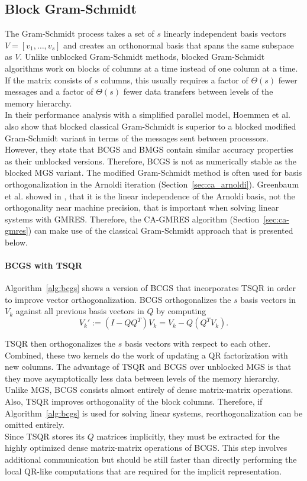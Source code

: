 \documentclass{scrartcl}
\numberwithin{equation}{section}
\begin{document}
\subsection{Block Gram-Schmidt} \label{sec:block gram-schmidt}
The Gram-Schmidt process takes a set of $s$ linearly independent basis vectors $V = [v_1, \ldots, v_s]$ and creates an orthonormal basis that spans the same subspace as $V$. Unlike unblocked Gram-Schmidt methods, blocked Gram-Schmidt algorithms work on blocks of columns at a time instead of one column at a time. If the matrix consists of $s$ columns, this usually requires a factor of $\Theta (s)$ fewer messages and a factor of $\Theta(s)$ fewer data transfers between levels of the memory hierarchy.\\
In their performance analysis with a simplified parallel model, Hoemmen et al. \cite{Hoemmen:2010:CKS:1970638} also show that blocked classical Gram-Schmidt is superior to a blocked modified Gram-Schmidt variant in terms of the messages sent between processors. However, they state that BCGS and BMGS contain similar accuracy properties as their unblocked versions. Therefore, BCGS is not as numerically stable as the blocked MGS variant. The modified Gram-Schmidt method is often used for basis orthogonalization in the Arnoldi iteration (Section~\ref{sec:ca_arnoldi}). Greenbaum et al. showed in \cite{Greenbaum97numericalbehaviour}, that it is the linear independence of the Arnoldi basis, not the orthogonality near machine precision, that is important when solving linear systems with GMRES. Therefore, the CA-GMRES algorithm (Section~\ref{sec:ca-gmres}) can make use of the classical Gram-Schmidt approach that is presented below.

\paragraph{BCGS with TSQR} Algorithm~\ref{alg:bcgs} shows a version of BCGS that incorporates TSQR in order to improve vector orthogonalization. BCGS orthogonalizes the $s$ basis vectors in $V_k$ against all previous basis vectors in $Q$ by computing
\begin{equation}
	V_k' := (I - QQ^T)V_k = V_k - Q(Q^T V_k).
\end{equation}

TSQR then orthogonalizes the $s$ basis vectors with respect to each other. Combined, these two kernels do the work of updating a QR factorization with new columns. The advantage of TSQR and BCGS over unblocked MGS is that they move asymptotically less data between levels of the memory hierarchy. Unlike MGS, BCGS consists almost entirely of dense matrix-matrix operations. Also, TSQR improves orthogonality of the block columns. Therefore, if Algorithm~\ref{alg:bcgs} is used for solving linear systems, reorthogonalization can be omitted entirely.\\
Since TSQR stores its $Q$ matrices implicitly, they must be extracted for the highly optimized dense matrix-matrix operations of BCGS. This step involves additional communication but should be still faster than directly performing the local QR-like computations that are required for the implicit representation.
\end{document}

